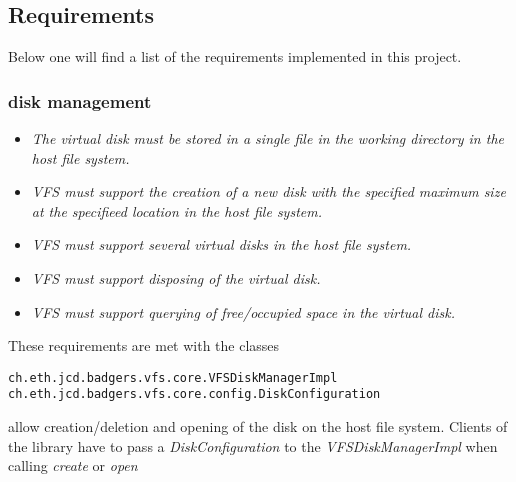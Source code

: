 \subsection{Requirements}
Below one will find a list of the requirements implemented in this project.

\subsubsection {disk management}
\begin{itemize}
  \item \emph{The virtual disk must be stored in a single file in the working
  directory in the host file system.}
  \item \emph{VFS must support the creation of a new disk with the specified
  maximum size at the specifieed location in the host file system. }
  \item \emph{VFS must support several virtual disks in the host file system.}
  \item \emph{VFS must support disposing of the virtual disk.}
  \item \emph{VFS must support querying of free/occupied space in the virtual
  disk.}
\end{itemize}  These requirements are met with the classes
\begin{verbatim}
ch.eth.jcd.badgers.vfs.core.VFSDiskManagerImpl
ch.eth.jcd.badgers.vfs.core.config.DiskConfiguration
\end{verbatim} allow creation/deletion and opening of the disk on the host
file system. Clients of the library have to pass a \textit{DiskConfiguration}
to the \textit{VFSDiskManagerImpl} when calling \textit{create} or
\textit{open}

